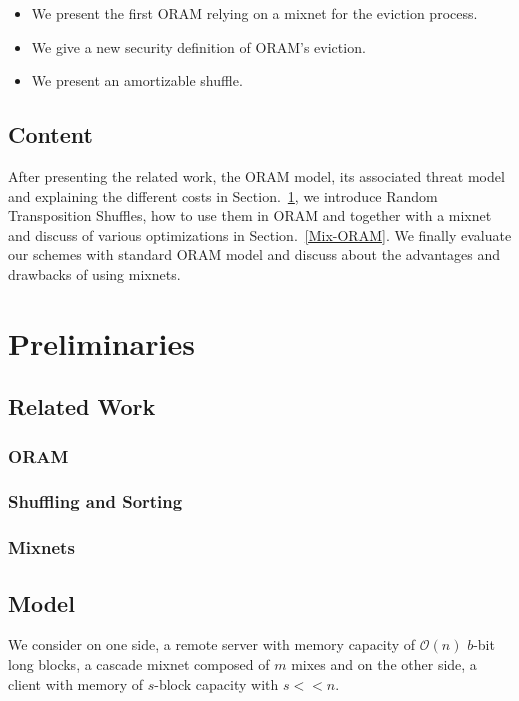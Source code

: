 \documentclass[english,oneside,twocolumn]{article}
\begin{document}
\begin{itemize}
 \item We present the first ORAM relying on a mixnet for the eviction process.
 \item We give a new security definition of ORAM's eviction. %
 \item We present an amortizable shuffle.
\end{itemize}

\subsection{Content}
After presenting the related work, the ORAM model, its associated threat model and explaining the different costs in Section.~\ref{Prelim}, we introduce Random Transposition Shuffles, how to use them in ORAM and together with a mixnet and discuss of various optimizations in Section.~\ref{Mix-ORAM}.
We finally evaluate our schemes with standard ORAM model and discuss about the advantages and drawbacks of using mixnets.

\section{Preliminaries}
\label{Prelim}

\subsection{Related Work}
\subsubsection{ORAM}
\subsubsection{Shuffling and Sorting}
\subsubsection{Mixnets}

\subsection{Model}
We consider on one side, a remote server with memory capacity of $\mathcal{O}\left(n\right)$ $b$-bit long blocks, a cascade mixnet composed of $m$ mixes and on the other side, a client with memory of $s$-block capacity with $s<<n$.
\end{document}
